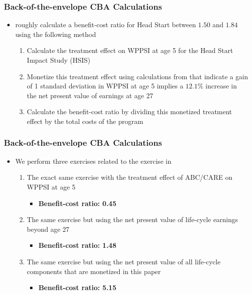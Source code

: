 \begin{frame}
	\frametitle{Back-of-the-envelope CBA Calculations}
	\begin{itemize}
		\item \citet{Kline-Walters_2016_QJE} roughly calculate a benefit-cost ratio for Head Start between $1.50$ and $1.84$ using the following method
		\begin{enumerate}
			\item Calculate the treatment effect on WPPSI at age 5 for the Head Start Impact Study (HSIS)
			\item Monetize this treatment effect using calculations from \citet{Chetty_Friedman_etal_2010_HowDoesYour} that indicate a gain of 1 standard deviation in WPPSI at age 5 implies a $12.1\%$ increase in the net present value of earnings at age 27
			\item Calculate the benefit-cost ratio by dividing this monetized treatment effect by the total costs of the program 
		\end{enumerate}
	\end{itemize}
\end{frame}

\begin{frame}
	\frametitle{Back-of-the-envelope CBA Calculations}
	\begin{itemize}
		\item We perform three exercises related to the exercise in \citet{Kline-Walters_2016_QJE}
		\begin{enumerate}
			\item The exact same exercise with the treatment effect of ABC/CARE on WPPSI at age 5
			\begin{itemize}
				\item \textbf{Benefit-cost ratio: 0.45}
			\end{itemize}
			\item The same exercise but using the net present value of life-cycle earnings beyond age 27
			\begin{itemize}
				\item \textbf{Benefit-cost ratio: 1.48}
			\end{itemize}
			\item The same exercise but using the net present value of all life-cycle components that are monetized in this paper
			\begin{itemize}
				\item \textbf{Benefit-cost ratio: 5.15}
			\end{itemize}
		\end{enumerate}
	\end{itemize}
\end{frame}

